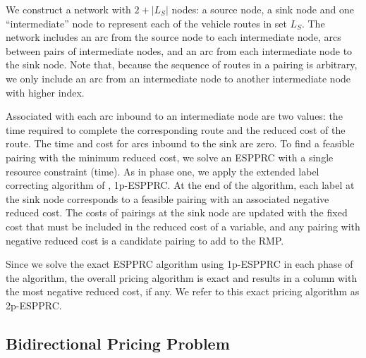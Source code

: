 We construct a network with $2 + |L_S|$ nodes: a source node, a sink node and 
one ``intermediate'' node to represent each of the vehicle routes in set $L_S$.  
The network includes an arc from the source node to each intermediate node, arcs 
between pairs of intermediate nodes, and an arc from each intermediate node 
to the sink node.  Note that, because the sequence of routes in a pairing
is arbitrary, we only include an arc from an intermediate node to another 
intermediate node with higher index.  

Associated with each arc inbound to an intermediate node are two values: the time 
required to complete the corresponding route and the reduced cost of the route.  
The time and cost for arcs inbound to the sink are zero.  To find a feasible pairing 
with the minimum reduced cost, we solve an ESPPRC with a single resource constraint 
(time). As in phase one, we apply the extended label correcting algorithm of 
\cite{Feillet}, 1p-ESPPRC.  At the end of the algorithm, each label at the sink node corresponds 
to a feasible pairing with an associated negative reduced cost. The costs of 
pairings at the sink node are updated with the fixed cost that must be included in the 
reduced cost of a variable, and any pairing with negative reduced cost is a candidate 
pairing to add to the RMP. 


Since we solve the exact ESPPRC algorithm using 1p-ESPPRC in each phase of the  
algorithm, the overall pricing algorithm is exact and results in a column with the 
most negative reduced cost, if any. We refer to this exact pricing 
algorithm as 2p-ESPPRC.



\subsection{Bidirectional Pricing Problem}

